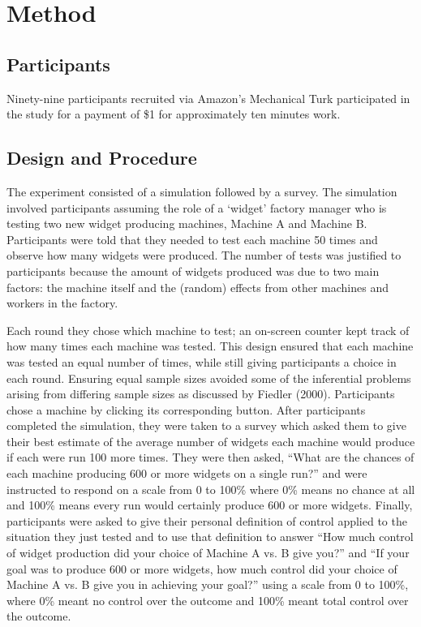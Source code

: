 \documentclass[USenglish,letterpaper,12pt,extrafontsizes,oneside,onecolumn,final]{memoir}
\begin{document}
\section{Method}

\subsection{Participants}
Ninety-nine participants recruited via Amazon's Mechanical Turk participated in the study for a payment of \$1 for approximately ten minutes work.

\subsection{Design and Procedure}

The experiment consisted of a simulation followed by a survey.  The simulation involved participants assuming the role of a `widget' factory manager who is testing two new widget producing machines, Machine A and Machine B.  Participants were told that they needed to test each machine 50 times and observe how many widgets were produced.  The number of tests was justified to participants because the amount of widgets produced was due to two main factors: the machine itself and the (random) effects from other machines and workers in the factory.

Each round they chose which machine to test; an on-screen counter kept track of how many times each machine was tested.  This design ensured that each
machine was tested an equal number of times, while still giving participants a choice in each round. Ensuring equal sample sizes avoided some of the inferential problems arising from differing sample sizes as discussed by Fiedler (2000). Participants chose a machine by clicking its corresponding button.  After participants completed the simulation, they were taken to a survey which asked them to give their best estimate of the average number of widgets each machine would produce if each were run 100 more times.  They were then asked, ``What are the chances of each machine producing 600 or more widgets on a single run?'' and were instructed to respond on a scale from 0 to 100\% where 0\% means no chance at all and 100\% means every run would certainly produce 600 or more widgets.  Finally, participants were asked to give their personal definition of control applied to the situation they just tested and to use that definition to answer ``How much control of widget production did your choice of Machine A vs. B give you?'' and ``If your goal was to produce 600 or more widgets, how much control did your choice of Machine A vs. B give you in achieving your goal?'' using a scale from 0 to 100\%, where 0\% meant no control over the outcome and 100\% meant total control over the outcome.
\end{document}
